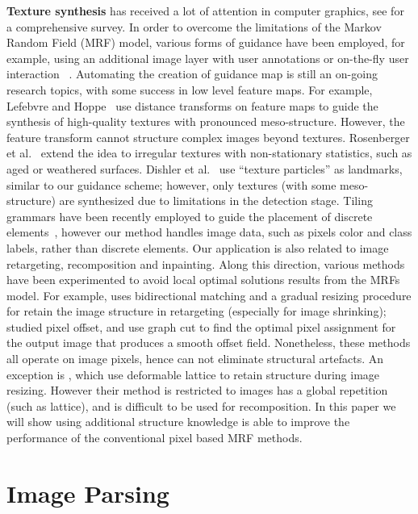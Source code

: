 \documentclass{acmtog}
\begin{document}
\textbf{Texture synthesis} has received a lot of attention in computer graphics, see \cite{Wei2009STAR} for a comprehensive survey. In order to overcome the limitations of the Markov Random Field (MRF) model, various forms of guidance have been employed, for example, using an additional image layer with user annotations \cite{Hertzmann2001IA} or on-the-fly user interaction ~\cite{Barnes2009,Hu2013PPI}. Automating the creation of guidance map is still an on-going research topics, with some success in low level feature maps. For example, Lefebvre and Hoppe~ use distance transforms on feature maps to guide the synthesis of high-quality textures with pronounced meso-structure. However, the feature transform cannot structure complex images beyond textures. Rosenberger et al.~ extend the idea to irregular textures with non-stationary statistics, such as aged or weathered surfaces. Dishler et al.~ use ``texture particles'' as landmarks, similar to our guidance scheme; however, only textures (with some meso-structure) are synthesized due to limitations in the detection stage. Tiling grammars have been recently employed to guide the placement of discrete elements~\cite{Ma2011DET,Ma2013DET}, however our method handles image data, such as pixels color and class labels, rather than discrete elements. Our application is also related to image retargeting, recomposition and inpainting. Along this direction, various methods have been experimented to avoid local optimal solutions results from the MRFs model. For example, \cite{Simakov2008SV} uses bidirectional matching and a gradual resizing procedure for retain the image structure in retargeting (especially for image shrinking); \cite{Pritch09ICCV,He2012PO} studied pixel offset, and use graph cut to find the optimal pixel assignment for the output image that produces a smooth offset field. Nonetheless, these methods all operate on image pixels, hence can not eliminate structural artefacts. An exception is \cite{Wu2010SS}, which use deformable lattice to retain structure during image resizing. However their method is restricted to images has a global repetition (such as lattice), and is difficult to be used for recomposition. In this paper we will show using additional structure knowledge is able to improve the performance of the conventional pixel based MRF methods. 

\section{Image Parsing}
\label{sec:ImageParsing}
\end{document}
